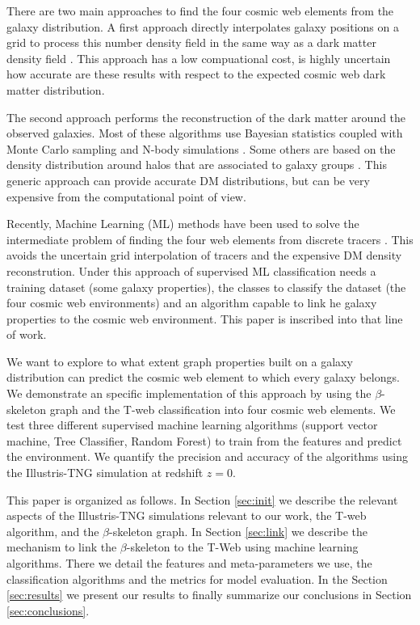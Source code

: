 \documentclass[usenatbib]{mnras}
\begin{document}
There are two main approaches to find the four cosmic web elements
from the galaxy distribution.
A first approach directly interpolates galaxy positions
on a grid to process this number density field in the same way as a dark
matter density field \citep{Eardley2015,Alpaslan2016,Tojeiro2017,Shadab2019}. 
This approach has a low compuational cost, is highly uncertain how
accurate are these results with respect to the expected  cosmic web
dark matter distribution. 

The second approach performs the reconstruction of the dark matter around
the observed galaxies.
Most of these algorithms use Bayesian statistics coupled with Monte
Carlo sampling  and N-body
simulations \citep{Jasche2010,Jasche2013a,Bos2014,LeclercqJasche2015,Horowitz2019,Burchett2020}. 
Some others are based on the density distribution around halos that
are associated to galaxy groups \citep{Wang2009,2011MNRAS.417.1303M}.  
This generic approach can provide accurate DM distributions, but can
be very expensive from the computational point of view. 

Recently, Machine Learning (ML) methods have been used to solve the
intermediate problem of finding the four web elements from discrete
tracers \citep{Hui2018}. 
This avoids the uncertain grid interpolation of tracers and the expensive
DM density reconstrution.
Under this approach of supervised ML classification needs a training
dataset (some galaxy properties), the classes to classify the dataset
(the four cosmic web environments) and an algorithm capable to link
he galaxy properties to the cosmic web environment.
This paper is inscribed into that line of work.


We want to explore to what extent graph properties built on a galaxy
distribution can predict the cosmic web element to which every galaxy
belongs. 
We demonstrate an specific implementation of this approach by using
the $\beta$-skeleton graph \citep{Fang2019} and the  T-web
\citep{Forero-Romero2009} classification into four cosmic web
elements.  
We test three different supervised machine learning
algorithms (support vector machine, Tree Classifier, Random Forest) 
to train from the features and predict the environment.
We quantify the precision and accuracy of the algorithms using 
the Illustris-TNG simulation \citep{Nelson2015} at redshift $z=0$.

This paper is organized as follows. 
In Section \ref{sec:init} we describe the relevant aspects of the Illustris-TNG
simulations relevant to our work, the T-web algorithm,
and the $\beta$-skeleton graph.
In Section \ref{sec:link} we describe the mechanism to link the
$\beta$-skeleton to the T-Web using machine learning algorithms. 
There we detail the features and meta-parameters we use, the
classification algorithms and the metrics for model evaluation.  
In the Section \ref{sec:results} we present our results
to finally summarize our conclusions in Section
\ref{sec:conclusions}. 
\end{document}
